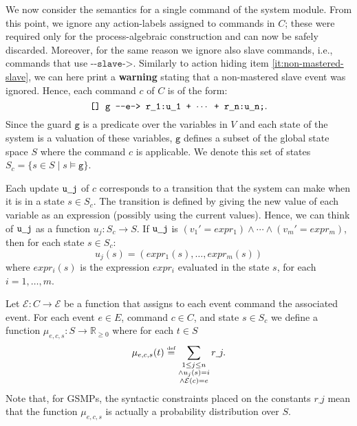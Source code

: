 \documentclass{article}
\newcommand{\eqdef}{\ensuremath{\stackrel{\text{\tiny def}}{=}}}
\newcommand{\arci}[1]{{-}{-}{#1}->}
\newcommand{\Rsetpo}{\mathbb{R}_{\ge 0}}
\newcommand{\calE}{\mathcal{E}}
\renewcommand{\_}{\underline{~}}
\newcommand{\events}{{\calE}}
\newcommand{\suc}{Succ}
\newcommand{\code}[1]{\texttt{#1}}
\begin{document}
We now consider the semantics for a single command of the system module. 
From this point, we ignore any action-labels assigned to commands in $C$; these were required only for the process-algebraic construction and can now be safely discarded.
Moreover, for the same reason we ignore also slave commands, i.e., commands that use $\code{\arci{slave}}$. Similarly to action hiding item \ref{it:non-mastered-slave}, we can here print a \textbf{warning} stating that a non-mastered slave event was ignored.
Hence, each command $c$ of $C$ is of the form:
$$\code{[] g \arci{e} r\_1:u\_1 + $\cdots$ + r\_n:u\_n;}.$$
%
Since the guard $\code{g}$ is a predicate over the variables in $V$ and each state of the system is a valuation of these variables, $\code{g}$ defines a subset of the global state space $S$ where the command $c$ is applicable. 
We denote this set of states $S_c = \{s \in S \mid s \models \code{g}\}$.

Each update $\code{u\_j}$ of $c$ corresponds to a transition that the system can make when it is in a state $s \in S_c$. 
The transition is defined by giving the new value of each variable as an expression (possibly using the current values).
Hence, we can think of $\code{u\_j}$ as a function $u_j\colon S_c \rightarrow S$.
If $\code{u\_j}$ is $(v_1' = expr_1)\wedge \cdots \wedge (v_m'
= expr_m)$, then for each state $s \in S_c$:
$$
u_j(s) = (expr_1(s), \ldots, expr_m(s))
$$
where $expr_i(s)$ is the expression $expr_i$ evaluated in the state $s$, for each $i=1,\dots,m$.
%

Let $\mathcal{E}\colon C \to \events$ be a function that assigns to each event command the associated event. 
For each event $e \in E$, command $c \in C$, and state $s \in S_c$ we define a function $\mu_{e,c,s} \colon S \to \mathbb{R}_{\geq0}$ where for each $t\in S$ 
\[ \mu_{e,c,s}(t) \eqdef \sum_{\substack{
		1 \leq j \leq n \\
		\wedge u_j(s) = i \\
		\wedge \mathcal{E}(c)=e}} r\_j. \]
Note that, for GSMPs, the syntactic constraints placed on the constants $r\_j$ mean
that the function $\mu_{e,c,s}$ is actually a probability distribution over $S$.

\end{document}
